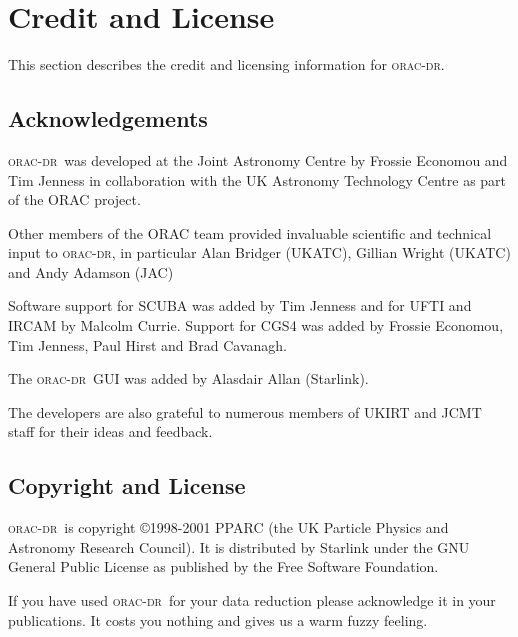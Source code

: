 \documentclass[twoside,11pt]{article}
\renewcommand{\_}{\texttt{\symbol{95}}}
\newcommand{\oracdr}{\textsc{orac-dr}}
\begin{document}
\section{Credit and License\label{Credit_And_Licence}}

This section describes the credit and licensing information for \oracdr.

\subsection*{Acknowledgements\label{ORAC-DR_Acknowledgements}}

\oracdr\ was developed at the Joint Astronomy Centre by
Frossie Economou and Tim Jenness in collaboration with the
UK Astronomy Technology Centre as part of the ORAC project.



Other members of the ORAC team provided invaluable scientific 
and technical input to \oracdr, in particular Alan Bridger (UKATC),
Gillian Wright (UKATC) and Andy Adamson (JAC)



Software support for SCUBA was added by Tim Jenness
and for UFTI and IRCAM by Malcolm Currie.
Support for CGS4 was added by Frossie Economou, Tim Jenness,
Paul Hirst and Brad Cavanagh.



The \oracdr\ GUI was added by Alasdair Allan (Starlink).



The developers are also grateful to numerous members of
UKIRT and JCMT staff for their ideas and feedback.

\subsection*{Copyright and License\label{ORAC-DR_Copyright_and_License}}

\oracdr\ is copyright \copyright 1998-2001 PPARC (the UK Particle Physics and Astronomy
Research Council). It is distributed by Starlink under the
GNU General Public License as published by the Free Software Foundation.



If you have used \oracdr\ for your data reduction please acknowledge it
in your publications. It costs you nothing and gives us a warm fuzzy
feeling.


\appendix
\end{document}
